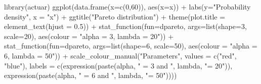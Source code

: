 \documentclass[landscape, 20pt]{extreport}
\newenvironment{Shaded}{\begin{snugshade}}{\end{snugshade}}
\newcommand{\AttributeTok}[1]{\textcolor[rgb]{0.77,0.63,0.00}{#1}}
\newcommand{\DecValTok}[1]{\textcolor[rgb]{0.00,0.00,0.81}{#1}}
\newcommand{\FloatTok}[1]{\textcolor[rgb]{0.00,0.00,0.81}{#1}}
\newcommand{\FunctionTok}[1]{\textcolor[rgb]{0.00,0.00,0.00}{#1}}
\newcommand{\NormalTok}[1]{#1}
\newcommand{\SpecialCharTok}[1]{\textcolor[rgb]{0.00,0.00,0.00}{#1}}
\newcommand{\StringTok}[1]{\textcolor[rgb]{0.31,0.60,0.02}{#1}}
\theoremstyle{definition}
\theoremstyle{definition}
\theoremstyle{definition}
\theoremstyle{definition}
\theoremstyle{remark}
\begin{document}
\begin{Shaded}
\begin{Highlighting}[]
\FunctionTok{library}\NormalTok{(actuar)}
\FunctionTok{ggplot}\NormalTok{(}\FunctionTok{data.frame}\NormalTok{(}\AttributeTok{x=}\FunctionTok{c}\NormalTok{(}\DecValTok{0}\NormalTok{,}\DecValTok{60}\NormalTok{)), }\FunctionTok{aes}\NormalTok{(}\AttributeTok{x=}\NormalTok{x)) }\SpecialCharTok{+}
  \FunctionTok{labs}\NormalTok{(}\AttributeTok{y=}\StringTok{"Probability density"}\NormalTok{, }\AttributeTok{x =} \StringTok{"x"}\NormalTok{) }\SpecialCharTok{+} 
  \FunctionTok{ggtitle}\NormalTok{(}\StringTok{"Pareto distribution"}\NormalTok{)  }\SpecialCharTok{+}
  \FunctionTok{theme}\NormalTok{(}\AttributeTok{plot.title =} \FunctionTok{element\_text}\NormalTok{(}\AttributeTok{hjust =} \FloatTok{0.5}\NormalTok{)) }\SpecialCharTok{+}
  \FunctionTok{stat\_function}\NormalTok{(}\AttributeTok{fun=}\NormalTok{dpareto, }\AttributeTok{args=}\FunctionTok{list}\NormalTok{(}\AttributeTok{shape=}\DecValTok{3}\NormalTok{, }\AttributeTok{scale=}\DecValTok{20}\NormalTok{), }\FunctionTok{aes}\NormalTok{(}\AttributeTok{colour =} \StringTok{"alpha = 3, lambda = 20"}\NormalTok{)) }\SpecialCharTok{+}
  \FunctionTok{stat\_function}\NormalTok{(}\AttributeTok{fun=}\NormalTok{dpareto, }\AttributeTok{args=}\FunctionTok{list}\NormalTok{(}\AttributeTok{shape=}\DecValTok{6}\NormalTok{, }\AttributeTok{scale=}\DecValTok{50}\NormalTok{), }\FunctionTok{aes}\NormalTok{(}\AttributeTok{colour =} \StringTok{"alpha = 6, lambda = 50"}\NormalTok{)) }\SpecialCharTok{+}
  \FunctionTok{scale\_colour\_manual}\NormalTok{(}\StringTok{"Parameters"}\NormalTok{, }\AttributeTok{values =} \FunctionTok{c}\NormalTok{(}\StringTok{"red"}\NormalTok{, }\StringTok{"blue"}\NormalTok{), }\AttributeTok{labels =} \FunctionTok{c}\NormalTok{(}\FunctionTok{expression}\NormalTok{(}\FunctionTok{paste}\NormalTok{(alpha, }\StringTok{" = 3 and "}\NormalTok{, lambda, }\StringTok{"= 20"}\NormalTok{)),  }\FunctionTok{expression}\NormalTok{(}\FunctionTok{paste}\NormalTok{(alpha, }\StringTok{" = 6 and "}\NormalTok{, lambda, }\StringTok{"= 50"}\NormalTok{)))) }
\end{Highlighting}
\end{Shaded}
\end{document}
